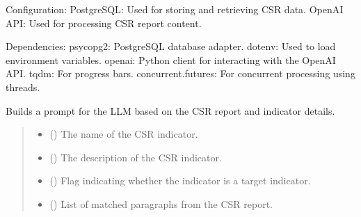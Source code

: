 \documentclass[letterpaper,10pt,english]{sphinxmanual}
\begin{document}
\sphinxAtStartPar
Configuration:
\sphinxhyphen{} PostgreSQL: Used for storing and retrieving CSR data.
\sphinxhyphen{} OpenAI API: Used for processing CSR report content.

\sphinxAtStartPar
Dependencies:
\sphinxhyphen{} psycopg2: PostgreSQL database adapter.
\sphinxhyphen{} dotenv: Used to load environment variables.
\sphinxhyphen{} openai: Python client for interacting with the OpenAI API.
\sphinxhyphen{} tqdm: For progress bars.
\sphinxhyphen{} concurrent.futures: For concurrent processing using threads.

\begin{fulllineitems}
\label{\detokenize{modules.data_storage:modules.data_storage.llm_analyse.build_prompt}}
\pysigstartsignatures
\pysiglinewithargsret
{}
{\sphinxparamcomma {}\sphinxparamcomma {}\sphinxparamcomma {}\sphinxparamcomma {}}
{}
\pysigstopsignatures
\sphinxAtStartPar
Builds a prompt for the LLM based on the CSR report and indicator details.
\begin{quote}\begin{description}
\begin{itemize}
\item {} 
\sphinxAtStartPar
{} () \textendash{} The name of the CSR indicator.

\item {} 
\sphinxAtStartPar
{} () \textendash{} The description of the CSR indicator.

\item {} 
\sphinxAtStartPar
{} () \textendash{} Flag indicating whether the indicator is a target indicator.

\item {} 
\sphinxAtStartPar
{} () \textendash{} List of matched paragraphs from the CSR report.


\end{itemize}
\end{description}
\end{quote}
\end{fulllineitems}
\end{document}
